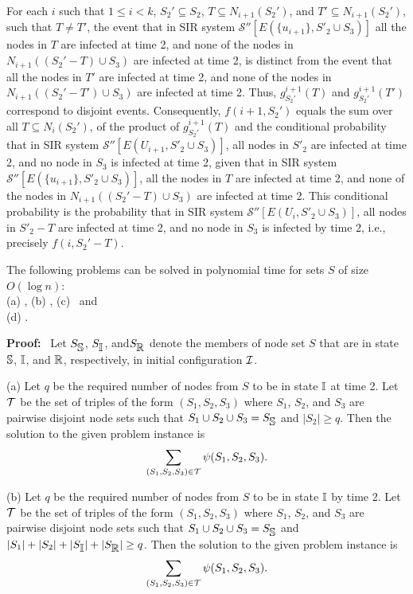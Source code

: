 For each $i$ such that $1 \leq i < k$, $S_2' \subseteq S_2$, $T \subseteq N_{i+1}(S_2')$,
and $T' \subseteq N_{i+1}(S_2')$, such that $T \neq T'$,
the event that in SIR system $\mathcal{S}''[E(\{ u_{i+1} \}, S'_2 \cup S_3)]$
all the nodes in $T$ are infected at time 2, 
and none of the nodes in $N_{i+1}((S_2' -T) \cup S_3)$ are infected at time 2,
is distinct from the event that 
all the nodes in $T'$ are infected at time 2, 
and none of the nodes in $N_{i+1}((S_2' -T') \cup S_3)$ are infected at time 2.
Thus, $g^{i+1}_{S_2'}(T)$ and $g^{i+1}_{S_2'}(T')$ correspond to disjoint events.
Consequently, $f(i+1, S_2')$ equals the sum over all $T \subseteq N_i(S_2')$,
of the product of $g^{i+1}_{S_2'}(T)$
and the conditional probability that 
in SIR system $\mathcal{S}''[E(U_{i+1}, S'_2 \cup S_3)]$,
all nodes in $S'_2$ are infected at time 2,
and no node in $S_3$ is infected  at time 2,
given that in SIR system $\mathcal{S}''[E(\{ u_{i+1} \}, S'_2 \cup S_3)]$,
all the nodes in $T$ are infected at time 2, 
and none of the nodes in $N_{i+1}((S_2' -T) \cup S_3)$ are infected at time 2.
This conditional probability is the probability that
in SIR system $\mathcal{S}''[E(U_i, S'_2 \cup S_3)]$,
all nodes in $S'_2 - T$ are infected at time 2,
and no node in $S_3$ is infected by time 2, i.e.,
precisely $f(i, S_2'-T)$.
\QED

\begin{corollary}\label{cor:4probs_time_2}
The following problems can be solved  in polynomial time
for sets $S$ of size $O(\log{n})$: \\
(a) \TwoNewInfs{}, (b) \TwoTotInfs{}, (c) \TwoVuls{} ~and\\
(d) \TwoTotVuls{}.
\end{corollary}
\textbf{Proof:}~  
Let $S_{\mbox{$\mathbb{S}$}}$, $S_{\mbox{$\mathbb{I}$}}$, and$S_{\mbox{$\mathbb{R}$}}$ denote the members of node set $S$ 
that are in state $\mbox{$\mathbb{S}$}$,   $\mbox{$\mathbb{I}$}$, and  $\mbox{$\mathbb{R}$}$, respectively,
in initial configuration $\mbox{${\cal I}$}{}$. 

(a) 
Let $q$ be the required number of nodes from $S$ to be in state $\mbox{$\mathbb{I}$}$
at time 2.
Let $\cal T$ be the set of triples of the form $(S_1, S_2, S_3)$
where $S_1$, $S_2$, and $S_3$ are pairwise disjoint node sets such that
$S_1 \cup S_2 \cup S_3 = S_{\mbox{$\mathbb{S}$}}$ and $|S_2| \geq q$.
Then the solution to the given \TwoNewInfs{} problem instance is 
\[
\sum_{(S_1, S_2, S_3) \in {\cal T} } \psi(S_1, S_2, S_3).
\]

(b) 
Let $q$ be the required number of nodes from $S$ to be in state $\mbox{$\mathbb{I}$}$ by time 2.
Let $\cal T$ be the set of triples of the form $(S_1, S_2, S_3)$
where $S_1$, $S_2$, and $S_3$ are pairwise disjoint node sets such that
$S_1 \cup S_2 \cup S_3 = S_{\mbox{$\mathbb{S}$}}$ 
and $|S_1| + |S_2| + |S_{\mbox{$\mathbb{I}$}}| + |S_{\mbox{$\mathbb{R}$}} |  \geq q$.
Then the solution to the given \TwoNewInfs{} problem instance is 
\[
\sum_{(S_1, S_2, S_3) \in {\cal T} } \psi(S_1, S_2, S_3).
\]

